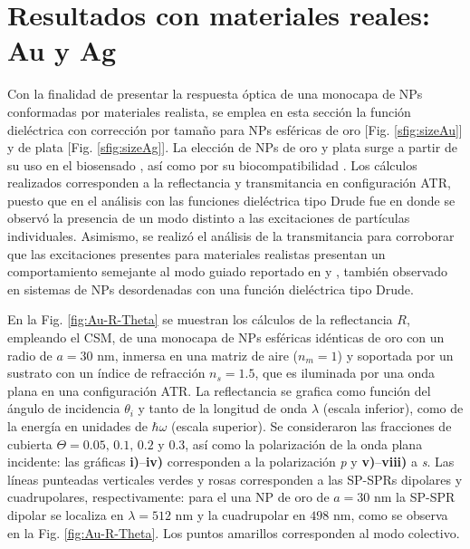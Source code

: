 \section{Resultados con materiales reales: Au y Ag}
\label{section:AuAg}

Con la finalidad de presentar la respuesta óptica de una monocapa de NPs conformadas por materiales realista, se emplea en esta sección la función dieléctrica con corrección por tamaño para NPs esféricas de oro [Fig. \ref{sfig:sizeAu}] y de plata [Fig. \ref{sfig:sizeAg}]. La elección de NPs de oro y plata surge a partir de su uso en el biosensado \cite{jain2008noble}, así como por su biocompatibilidad \cite{fan2009bio,bosetti2002silver}. Los cálculos realizados corresponden a la reflectancia y transmitancia en configuración ATR, puesto que en el análisis con las funciones dieléctrica tipo Drude fue en donde se observó la presencia de un modo distinto a las excitaciones de partículas individuales. Asimismo, se realizó el análisis de la transmitancia para corroborar que las excitaciones presentes para materiales realistas presentan un comportamiento semejante al modo guiado reportado en \cite{kabashin2009plasmonic} y \cite{danilov2018ultra}, también observado en sistemas de NPs desordenadas con una función dieléctrica tipo Drude.

En la Fig.  \ref{fig:Au-R-Theta} se muestran los cálculos de la reflectancia $R$, empleando el CSM, de una monocapa de NPs esféricas idénticas de oro con un radio de $a = 30$ nm, inmersa en una matriz de aire ($n_m = 1$) y soportada por un sustrato con un índice de refracción $n_s = 1.5$, que es iluminada por una onda plana en una configuración ATR. La reflectancia se grafica como función del ángulo de incidencia $\theta_i$ y tanto de la longitud de onda $\lambda$ (escala inferior), como de la energía en unidades de $\hbar\omega$ (escala superior). Se consideraron las fracciones de cubierta $\Theta = 0.05,\,0.1,\,0.2$ y $0.3$, así como la polarización de la onda plana incidente: las gráficas \textbf{i)}--\textbf{iv)} corresponden a la polarización \emph{p} y \textbf{v)}--\textbf{viii)} a \emph{s}. Las líneas punteadas verticales verdes y rosas corresponden a las SP-SPRs dipolares y cuadrupolares, respectivamente: para el una NP de oro de $a= 30$ nm la SP-SPR dipolar se localiza en $\lambda = 512$ nm y la cuadrupolar en $498$ nm, como se observa en la Fig. \ref{fig:Au-R-Theta}. Los puntos amarillos corresponden al modo colectivo.


